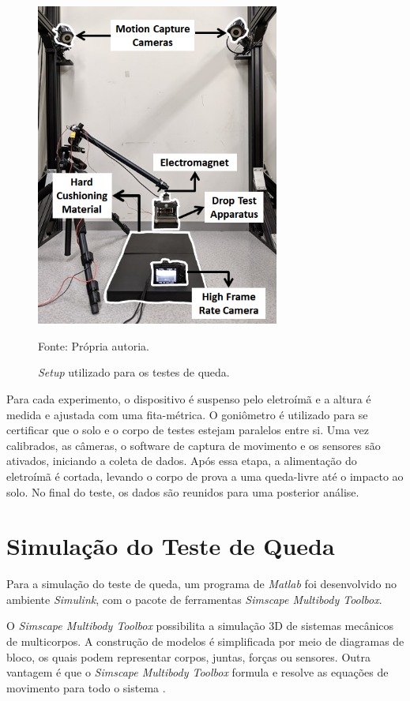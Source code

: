  \begin{figure}[H]  
        \centering
        \caption{\textit{Setup} utilizado para os testes de queda.}
        \includegraphics[width=8cm]{./figs/environment.PNG}
        \par\medskip
        Fonte: Própria autoria.
        \label{fig:environment}
\end{figure}

Para cada experimento, o dispositivo é suspenso pelo eletroímã e a altura é medida e ajustada com uma fita-métrica. O goniômetro é utilizado para se certificar que o solo e o corpo de testes estejam paralelos entre si.
Uma vez calibrados, as câmeras, o software de captura de movimento e os sensores são ativados, iniciando a coleta de dados. Após essa etapa, a alimentação do eletroímã é cortada, levando o corpo de prova a uma queda-livre até o impacto ao solo. No final do teste, os dados são reunidos para uma posterior análise.

\section{Simulação do Teste de Queda}

Para a simulação do teste de queda, um programa de \textit{Matlab} foi desenvolvido no ambiente \textit{Simulink}, com o pacote de ferramentas \textit{Simscape Multibody Toolbox}.

O \textit{Simscape Multibody Toolbox} possibilita a simulação 3D de sistemas mecânicos de multicorpos. A construção de modelos é simplificada por meio de diagramas de bloco, os quais podem representar corpos, juntas, forças ou sensores. Outra vantagem é que o \textit{Simscape Multibody Toolbox} formula e resolve as equações de movimento para todo o sistema \cite{simscape}.

